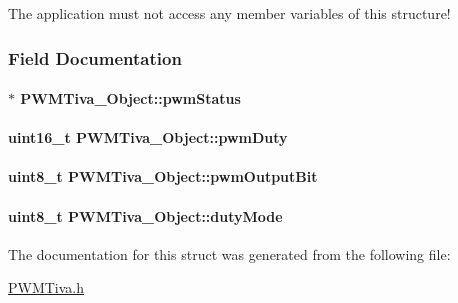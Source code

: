The application must not access any member variables of this structure! 

\subsubsection{Field Documentation}
\paragraph[{pwm\+Status}]{$\ast$ P\+W\+M\+Tiva\+\_\+\+Object\+::pwm\+Status}\label{struct_p_w_m_tiva___object_ac8bd4faf595db91eed648925028a8ee2}
\paragraph[{pwm\+Duty}]{\setlength{\rightskip}{0pt plus 5cm}uint16\+\_\+t P\+W\+M\+Tiva\+\_\+\+Object\+::pwm\+Duty}\label{struct_p_w_m_tiva___object_a800cd6659e683499a1d10781f6dd8039}
\paragraph[{pwm\+Output\+Bit}]{\setlength{\rightskip}{0pt plus 5cm}uint8\+\_\+t P\+W\+M\+Tiva\+\_\+\+Object\+::pwm\+Output\+Bit}\label{struct_p_w_m_tiva___object_a2495251d43ff49e93db61ffaf060225b}
\paragraph[{duty\+Mode}]{\setlength{\rightskip}{0pt plus 5cm}uint8\+\_\+t P\+W\+M\+Tiva\+\_\+\+Object\+::duty\+Mode}\label{struct_p_w_m_tiva___object_a55f216f7bf6438a120a7f0b52726ad55}


The documentation for this struct was generated from the following file\+:\begin{DoxyCompactItemize}
\item 
\hyperlink{_p_w_m_tiva_8h}{P\+W\+M\+Tiva.\+h}\end{DoxyCompactItemize}
